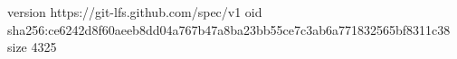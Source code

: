 version https://git-lfs.github.com/spec/v1
oid sha256:ce6242d8f60aeeb8dd04a767b47a8ba23bb55ce7c3ab6a771832565bf8311c38
size 4325
